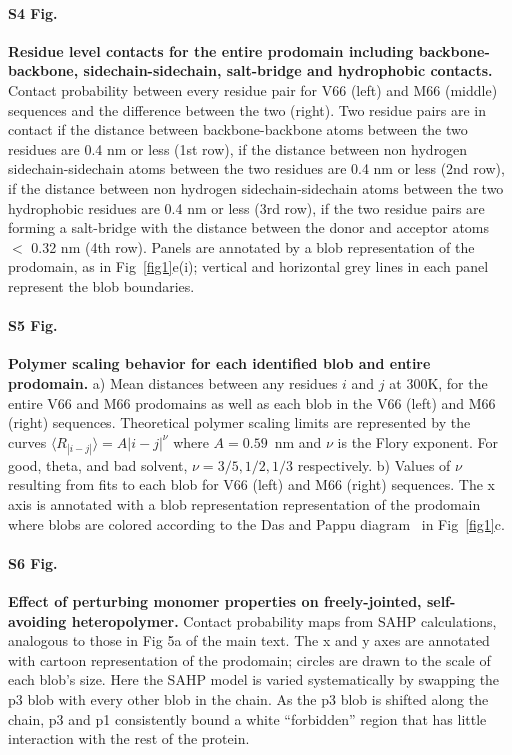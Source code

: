 \documentclass[10pt,letterpaper]{article}
\begin{document}
\paragraph*{S4 Fig.}
\label{S4_Fig}
{\bf Residue level contacts for the entire prodomain including backbone-backbone, sidechain-sidechain, salt-bridge and hydrophobic contacts.}
Contact probability between every residue pair for V66 (left) and M66 (middle) sequences and the difference between the two (right). Two residue pairs are in contact if the distance between backbone-backbone atoms between the two residues are 0.4 nm or less (1st row), if the distance between non hydrogen sidechain-sidechain atoms between the two residues are 0.4 nm or less (2nd row), if the distance between non hydrogen sidechain-sidechain atoms between the two hydrophobic residues are 0.4 nm or less (3rd row), if the two residue pairs are forming a salt-bridge with the distance between the donor and acceptor atoms $<$ 0.32 nm (4th row). Panels are annotated by a blob representation of the prodomain, as in Fig~\ref{fig1}e(i); vertical and horizontal grey lines in each panel represent the blob boundaries.

\paragraph*{S5 Fig.}
\label{S5_Fig}
{\bf Polymer scaling behavior for each identified blob and entire prodomain.} 
a) Mean distances between any residues $i$ and $j$ at 300K, for the entire V66 and M66 prodomains as well as each blob in the V66 (left) and M66 (right) sequences. Theoretical polymer scaling limits are represented by the curves $\langle R_{|i-j|}\rangle = A |i-j|^{\nu}$ where $A=0.59$~nm and $\nu$ is the Flory exponent. For good, theta, and bad solvent, $\nu = 3/5, 1/2, 1/3$ respectively. b) Values of $\nu$ resulting from fits to each blob for V66 (left) and M66 (right) sequences. The x axis is annotated with a blob representation representation of the prodomain where blobs are colored according to the Das and Pappu diagram~\cite{Das2013} in Fig~\ref{fig1}c.

\paragraph*{S6 Fig.}
\label{S6_Fig}
{\bf Effect of perturbing monomer properties on freely-jointed, self-avoiding heteropolymer.}
Contact probability maps from SAHP calculations, analogous to those in Fig 5a of the main text. The x and y axes are annotated with cartoon representation of the prodomain; circles are drawn to the scale of each blob's size. Here the SAHP model is varied systematically by swapping the p3 blob with every other blob in the chain. As the p3 blob is shifted along the chain, p3 and p1 consistently bound a white ``forbidden'' region that has little interaction with the rest of the protein.
\end{document}
